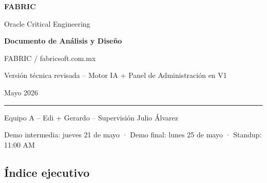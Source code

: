 \documentclass[11pt,letterpaper]{article}
\begin{document}
\begin{titlepage}
\pagecolor{FabricBlack}\color{white}
\vspace*{2cm}
{\Huge\bfseries\sffamily FABRIC\par}
\vspace{0.3cm}
{\Large Oracle Critical Engineering\par}
\vfill
{\huge\bfseries Documento de An\'alisis y Dise\~no\par}
\vspace{0.35cm}
{\Large FABRIC / fabricsoft.com.mx\par}
\vspace{1cm}
{\large Versi\'on t\'ecnica revisada -- Motor IA + Panel de Administraci\'on en V1\par}
{\large Mayo 2026\par}
\vfill
{\color{FabricChampagne}\rule{\textwidth}{1.2pt}}\par
\vspace{0.4cm}
{\large Equipo A -- Edi + Gerardo -- Supervisi\'on Julio \'Alvarez\par}
\end{titlepage}
\nopagecolor\color{FabricText}
\tableofcontents
\newpage

Demo intermedia: jueves 21 de mayo · Demo final: lunes 25 de mayo · Standup: 11:00 AM

\subsection{Índice ejecutivo}
\end{document}
